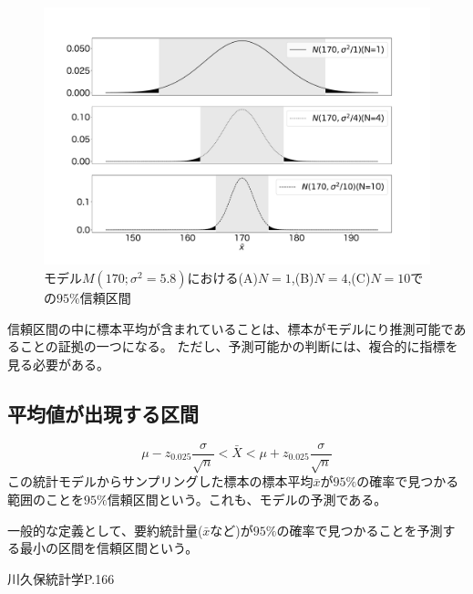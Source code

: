 \begin{figure}
\begin{center}
    \includegraphics[width=15cm]{./image/03_/confidence_interval.pdf}
    \caption{モデル$M(170;\sigma^2=5.8)$における(A)$N=1$,(B)$N=4$,(C)$N=10$での$95\%$信頼区間}
    \label{fig:confidence_interval_n}
    \end{center}
\end{figure}


信頼区間の中に標本平均が含まれていることは、標本がモデルにり推測可能であることの証拠の一つになる。
ただし、予測可能かの判断には、複合的に指標を見る必要がある。

\subsection{平均値が出現する区間}
\begin{equation*}
    \mu - z_{0.025} \frac{\sigma}{\sqrt{n}} < \bar{X} < \mu + z_{0.025} \frac{\sigma}{\sqrt{n}}
\end{equation*}
この統計モデルからサンプリングした標本の標本平均$\bar{x}$が$95\%$の確率で見つかる範囲のことを$95\%$信頼区間という。これも、モデルの予測である。

一般的な定義として、要約統計量($\bar{x}$など)が$95\%$の確率で見つかることを予測する最小の区間を信頼区間という。

\fi

 川久保統計学P.166
 \fi





